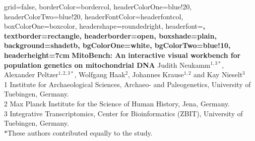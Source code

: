 \documentclass[a0paper,portrait, fontscale=0.285]{baposter}
\begin{document}


\begin{poster}{
	grid=false,
	borderColor=bordercol,
	headerColorOne=blue!20,
	headerColorTwo=blue!20,
	headerFontColor=headerfontcol,
	boxColorOne=boxcolor,
	headershape=roundedright,
	headerfont=\Large\sf\bf,
	textborder=rectangle,
	headerborder=open,
  	boxshade=plain,
	background=shadetb,
	bgColorOne=white,
	bgColorTwo=blue!10,
	headerheight=7cm
}
{
}
{\sf\bf
	MitoBench: An interactive visual workbench for population genetics on mitochondrial DNA
}
{
	\vspace{1em} Judith Neukamm$^{1,3*}$, Alexander Peltzer$^{1,2,3*}$, Wolfgang Haak$^{2}$, Johannes Krause$^{1,2}$ and Kay Nieselt$^{3}$\\
	\vspace{1em}
	{\footnotesize 	1 Institute for Archaeological Sciences, Archaeo- and Paleogenetics, University of Tuebingen, Germany.\\
	2 Max Planck Institute for the Science of Human History, Jena, Germany.\\
	3 Integrative Transcriptomics, Center for Bioinformatics (ZBIT), University of Tuebingen, Germany.\\
	$*$These authors contributed equally to the study.
	}
}
{
}
\end{poster}
\end{document}
